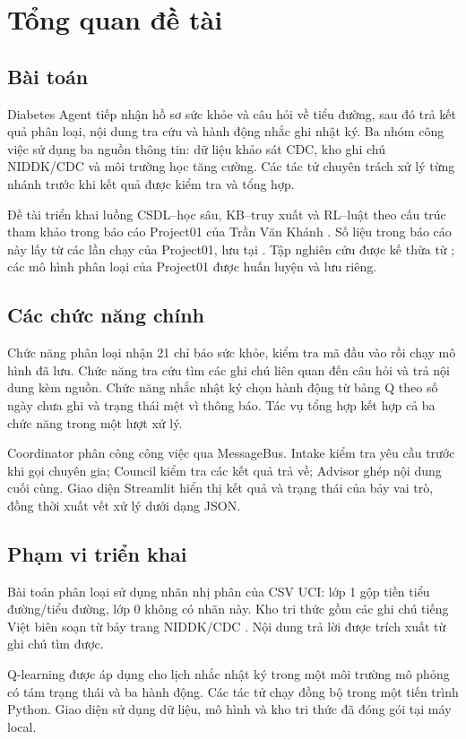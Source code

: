 \chapter{Tổng quan đề tài}
\section{Bài toán}
Diabetes Agent tiếp nhận hồ sơ sức khỏe và câu hỏi về tiểu đường, sau đó trả kết quả phân loại, nội dung tra cứu và hành động nhắc ghi nhật ký. Ba nhóm công việc sử dụng ba nguồn thông tin: dữ liệu khảo sát CDC, kho ghi chú NIDDK/CDC và môi trường học tăng cường. Các tác tử chuyên trách xử lý từng nhánh trước khi kết quả được kiểm tra và tổng hợp.

Đề tài triển khai luồng CSDL--học sâu, KB--truy xuất và RL--luật theo cấu trúc tham khảo trong báo cáo Project01 của Trần Văn Khánh \cite{reference_report}. Số liệu trong báo cáo này lấy từ các lần chạy của Project01, lưu tại . Tập nghiên cứu được kế thừa từ ; các mô hình phân loại của Project01 được huấn luyện và lưu riêng.

\section{Các chức năng chính}
Chức năng phân loại nhận 21 chỉ báo sức khỏe, kiểm tra mã đầu vào rồi chạy mô hình đã lưu. Chức năng tra cứu tìm các ghi chú liên quan đến câu hỏi và trả nội dung kèm nguồn. Chức năng nhắc nhật ký chọn hành động từ bảng Q theo số ngày chưa ghi và trạng thái mệt vì thông báo. Tác vụ tổng hợp kết hợp cả ba chức năng trong một lượt xử lý.

Coordinator phân công công việc qua MessageBus. Intake kiểm tra yêu cầu trước khi gọi chuyên gia; Council kiểm tra các kết quả trả về; Advisor ghép nội dung cuối cùng. Giao diện Streamlit hiển thị kết quả và trạng thái của bảy vai trò, đồng thời xuất vết xử lý dưới dạng JSON.



\section{Phạm vi triển khai}
Bài toán phân loại sử dụng nhãn nhị phân của CSV UCI: lớp 1 gộp tiền tiểu đường/tiểu đường, lớp 0 không có nhãn này. Kho tri thức gồm các ghi chú tiếng Việt biên soạn từ bảy trang NIDDK/CDC \cite{niddk_basic,niddk_tests}. Nội dung trả lời được trích xuất từ ghi chú tìm được.

Q-learning được áp dụng cho lịch nhắc nhật ký trong một môi trường mô phỏng có tám trạng thái và ba hành động. Các tác tử chạy đồng bộ trong một tiến trình Python. Giao diện sử dụng dữ liệu, mô hình và kho tri thức đã đóng gói tại máy local.
